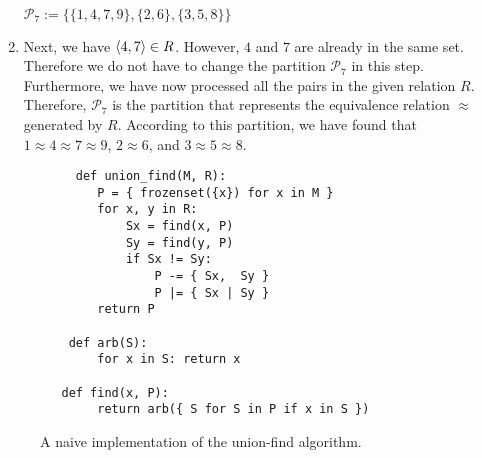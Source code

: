 \begin{enumerate}
      \\[0.2cm]
      \hspace*{1.3cm}
      $\mathcal{P}_7 := \bigl\{ \{1, 4, 7, 9\}, \{2,6\}, \{3,5,8\} \bigr\}$
\item Next, we have $\pair(4,7) \in R$.  However, $4$ and $7$ are already in the same set.
      Therefore we do not have to change the partition $\mathcal{P}_7$ in this step.
      Furthermore, we have now processed all the pairs in the given relation $R$.
      Therefore, $\mathcal{P}_7$ is the partition that represents the equivalence relation $\approx$ generated
      by $R$.  According to this partition, we have found that
      \\[0.2cm]
      \hspace*{1.3cm}
      $1 \approx 4 \approx 7 \approx 9$, \quad $2 \approx 6$,  \quad and \quad $3 \approx 5 \approx 8$.
\end{enumerate}
 
\begin{figure}[!ht]
\centering
\begin{verbatim}
     def union_find(M, R):
        P = { frozenset({x}) for x in M } 
        for x, y in R:
            Sx = find(x, P)
            Sy = find(y, P)
            if Sx != Sy:
                P -= { Sx,  Sy }
                P |= { Sx | Sy }
        return P
    
    def arb(S):
        for x in S: return x
    
   def find(x, P):
        return arb({ S for S in P if x in S })    
\end{verbatim}
\vspace*{-0.3cm}
\caption{A naive implementation of the union-find algorithm.}
\label{fig:Union-Find-Naive.ipynb}
\end{figure}


